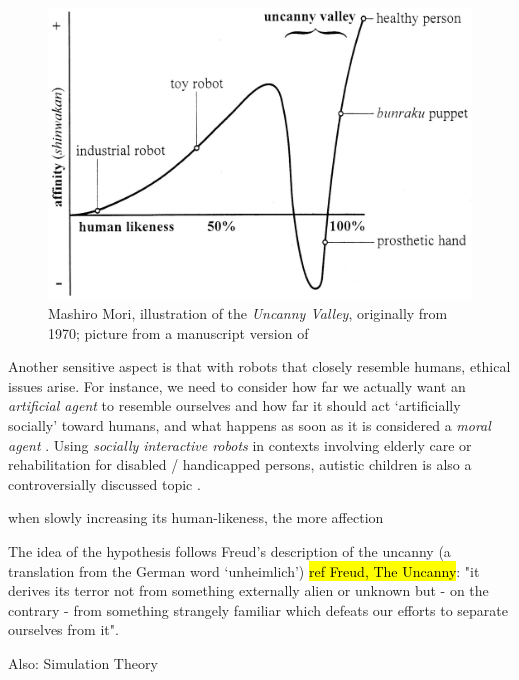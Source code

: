 \documentclass{frontiersSCNS} %
\begin{document}
\begin{figure}\centering
  \includegraphics[scale=0.6]{uncanny-valley.jpg}
 \caption{Mashiro Mori, illustration of the \textit{Uncanny Valley}, originally
 from 1970; picture from a manuscript version of \cite{mori_uncanny_2012}}

 \label{fig:uncanny_valley}       %
 \end{figure}

Another sensitive aspect is that with robots that closely resemble humans,
ethical issues arise. For instance, we need to consider how far we actually want
an \textit{artificial agent} to resemble ourselves and how far it should act
`artificially socially' toward humans, and what happens as soon as it is
considered a \textit{moral agent} \cite{sullins_when_2006}. Using
\textit{socially interactive robots} in contexts involving elderly care or
rehabilitation for disabled / handicapped persons, autistic children is also a
controversially discussed topic \cite{robins_robots_2005}.


when slowly increasing its human-likeness, the more affection 

The idea of the hypothesis follows Freud's description of the uncanny (a
translation from the German word `unheimlich') \hl{ref Freud, The Uncanny}: "it
derives its terror not from something externally alien or unknown but - on the
contrary - from something strangely familiar which defeats our efforts to
separate ourselves from it". \cite{hegel_understanding_2008}

	Also: Simulation Theory
\end{document}
